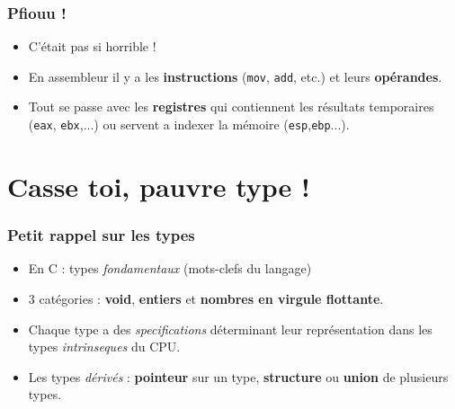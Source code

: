 \documentclass{beamer}
\begin{document}
\begin{frame}
\frametitle{Pfiouu !}
\begin{block}{}
\begin{itemize}
\item C'était pas si horrible !
\item En assembleur il y a les \textbf{instructions} (\lstinline[language={[x86masm]Assembler}]+mov+, \lstinline[language={[x86masm]Assembler}]+add+, etc.) et leurs \textbf{opérandes}.
\item Tout se passe avec les \textbf{registres} qui contiennent les résultats temporaires (\texttt{eax}, \texttt{ebx},...) ou servent a indexer la mémoire (\texttt{esp},\texttt{ebp}...).
\end{itemize}
\end{block}
\end{frame}

\section{Casse toi, pauvre type !}

\begin{frame}
\frametitle{Petit rappel sur les types} 

\begin{itemize}

\item En C : types \textit{fondamentaux} (mots-clefs du langage) 
\item 3 catégories : \textbf{void}, \textbf{entiers} et \textbf{nombres en virgule flottante}.
\item Chaque type a des \textit{specifications} déterminant leur représentation dans les types \textit{intrinseques} du CPU.
\pause 
\item Les types \textit{dérivés} : \textbf{pointeur} sur un type, \textbf{structure} ou \textbf{union} de plusieurs types.


\end{itemize}

\end{frame}
\end{document}
